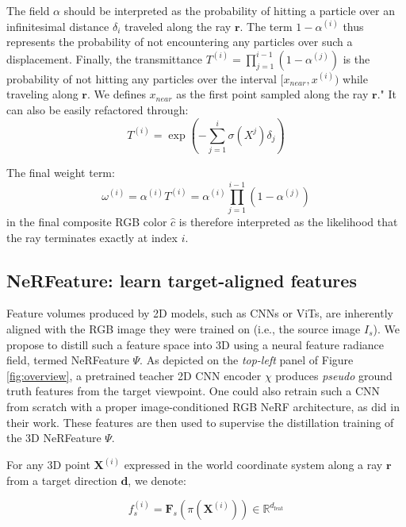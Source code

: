 The field $\alpha$ should be interpreted as the probability of hitting a particle over an infinitesimal distance $\delta_{i}$ traveled along the ray $\mathbf{r}$. The term $1 - \alpha^{(i)}$ thus represents the probability of not encountering any particles over such a displacement. Finally, the transmittance $T^{(i)} = \prod_{j=1}^{i-1}(1-\alpha^{(j)})$ is the probability of not hitting any particles over the interval $[x_{near}, x^{(i)})$ while traveling along $\mathbf{r}$. We defines $x_{near}$ as the first point sampled along the ray $\mathbf{r}$." It can also be easily refactored through: 
\begin{equation}
T^{(i)} = \exp\left( - \sum_{j=1}^{i}\sigma(X^{j})\delta_{j}\right)
\end{equation}

The final weight term: 
\begin{equation}
\label{eq:weights}
    \omega^{(i)} = \alpha^{(i)}T^{(i)} = \alpha^{(i)}\prod_{j=1}^{i-1}(1-\alpha^{(j)})
\end{equation}
in the final composite RGB color $\hat{c}$ is therefore interpreted as the likelihood that the ray terminates exactly at index $i$. 

\subsection{NeRFeature: learn target-aligned features}
\label{subsec:nerfeature}

Feature volumes produced by 2D models, such as CNNs or ViTs, are inherently aligned with the RGB image they were trained on (i.e., the source image $I_s$). We propose to distill such a feature space into 3D using a neural feature radiance field, termed NeRFeature $\Psi$. As depicted on the \textit{top-left} panel of Figure \ref{fig:overview}, a pretrained teacher 2D CNN encoder $\chi$ produces \textit{pseudo} ground truth features from the target viewpoint. One could also retrain such a CNN from scratch with a proper image-conditioned RGB NeRF architecture, as \cite{yu2021pixelnerf,li2022symmnerf,lin2023vision,jang2021codenerf} did in their work. These features are then used to supervise the distillation training of the 3D NeRFeature $\Psi$. \newline

For any 3D point $\mathbf{X}^{(i)}$ expressed in the world coordinate system along a ray $\mathbf{r}$ from a target direction $\mathbf{d}$, we denote: 

\begin{equation}
    f_{s}^{(i)} = \mathbf{F}_{s}(\pi(\mathbf{X}^{(i)}))  \in \mathbb{R}^{d_{\text{feat}}} 
    \label{eq:projection}
\end{equation}

